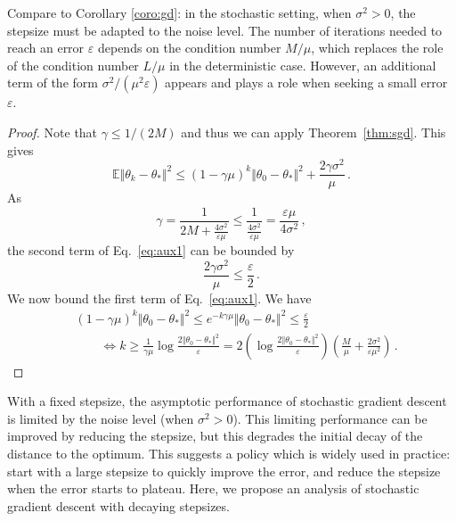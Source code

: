 \documentclass[11pt,reqno]{article}
\newcommand{\E}{\mathbb{E}}
\renewcommand{\leq}{\leqslant}
\renewcommand{\geq}{\geqslant}
\numberwithin{equation}{section}
\theoremstyle{plain}
\theoremstyle{definition}
\theoremstyle{remark}
\begin{document}
Compare to Corollary \ref{coro:gd}: in the stochastic setting, when $\sigma^2 > 0$, the stepsize must be adapted to the noise level. The number of iterations needed to reach an error $\varepsilon$ depends on the condition number $M/\mu$, which replaces the role of the condition number $L/\mu$ in the deterministic case. However, an additional term of the form $\sigma^2/(\mu^2 \varepsilon)$ appears and plays a role when seeking a small error $\varepsilon$. 

\begin{proof}
	Note that $\gamma \leq 1/(2M)$ and thus we can apply Theorem~\ref{thm:sgd}. This gives 
	\begin{equation}
		\label{eq:aux1}
		\E \Vert \theta_k - \theta_* \Vert^2 \leq \left(1 - \gamma \mu\right)^k \Vert \theta_0 - \theta_* \Vert^2 + \frac{2\gamma \sigma^2}{\mu} \, .
	\end{equation}
	As 
	\begin{equation*}
		\gamma = \frac{1}{2M + \frac{4\sigma^2}{\varepsilon\mu}} \leq \frac{1}{ \frac{4\sigma^2}{\varepsilon\mu}} = \frac{\varepsilon \mu}{4\sigma^2} \, ,
	\end{equation*}
the second term of Eq.~\eqref{eq:aux1} can be bounded by 
\begin{equation*}
	\frac{2\gamma \sigma^2}{\mu} \leq \frac{\varepsilon}{2} \, .
\end{equation*}
We now bound the first term of Eq.~\eqref{eq:aux1}. We have
\begin{align*}
	&\left(1 - \gamma \mu\right)^k \Vert \theta_0 - \theta_* \Vert^2 \leq e^{-k \gamma \mu} \Vert \theta_0 - \theta_* \Vert^2 \leq \frac{\varepsilon}{2}\\
	&\qquad \Longleftrightarrow k \geq \frac{1}{\gamma \mu} \log \frac{2 \Vert \theta_0 - \theta_* \Vert^2}{\varepsilon} = 2 \left(\log \frac{2 \Vert \theta_0 - \theta_* \Vert^2}{\varepsilon}\right) \left(\frac{M}{\mu} + \frac{2\sigma^2}{\varepsilon\mu^2}\right) \, .
\end{align*}
\end{proof}

With a fixed stepsize, the asymptotic performance of stochastic gradient descent is limited by the noise level (when $\sigma^2 > 0$). This limiting performance can be improved by reducing the stepsize, but this degrades the initial decay of the distance to the optimum. This suggests a policy which is widely used in practice: start with a large stepsize to quickly improve the error, and reduce the stepsize when the error starts to plateau. Here, we propose an analysis of stochastic gradient descent with decaying stepsizes.
\end{document}
